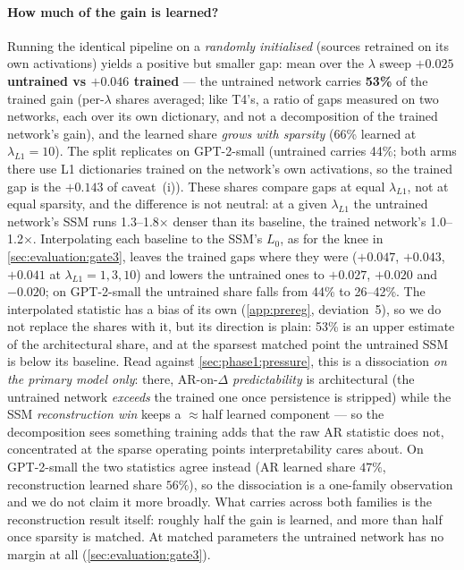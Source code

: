 \paragraph{How much of the gain is learned?}
Running the identical pipeline on a \emph{randomly initialised} \pythia{}
(sources retrained on its own activations) yields a positive but smaller gap:
mean over the $\lambda$ sweep \textbf{$+0.025$ untrained vs $+0.046$ trained}
--- the untrained network carries \textbf{53\%} of the trained gain
(per-$\lambda$ shares averaged; like T4's, a ratio of gaps measured on two
networks, each over its own dictionary, and not a decomposition of the
trained network's gain), and the
learned share \emph{grows with sparsity} (66\% learned at
$\lambda_{L1}{=}10$). The split replicates on GPT-2-small (untrained carries
44\%; both arms there use L1 dictionaries trained on the network's own
activations, so the trained gap is the $+0.143$ of caveat~(i)). These shares
compare gaps at equal $\lambda_{L1}$, not at equal sparsity, and the
difference is not neutral: at a given $\lambda_{L1}$ the untrained network's
SSM runs 1.3--1.8$\times$ denser than its baseline, the trained network's
1.0--1.2$\times$. Interpolating each baseline to the SSM's $L_0$, as for the
knee in \cref{sec:evaluation:gate3}, leaves the trained gaps where they were
($+0.047$, $+0.043$, $+0.041$ at $\lambda_{L1} = 1, 3, 10$) and lowers the
untrained ones to $+0.027$, $+0.020$ and $-0.020$; on GPT-2-small the
untrained share falls from 44\% to 26--42\%. The interpolated statistic has
a bias of its own (\cref{app:prereg}, deviation~5), so we do not replace the
shares with it, but its direction is plain: 53\% is an upper estimate of the
architectural share, and at the sparsest matched point the untrained SSM is
below its baseline. Read against \cref{sec:phase1:pressure}, this is a dissociation
\emph{on the primary model only}: there, AR-on-$\Delta$ \emph{predictability}
is architectural (the untrained network \emph{exceeds} the trained one once
persistence is stripped) while the SSM \emph{reconstruction win} keeps a
$\approx$half learned component --- so the decomposition sees something
training adds that the raw AR statistic does not, concentrated at the sparse
operating points interpretability cares about. On GPT-2-small the two
statistics agree instead (AR learned share $47\%$, reconstruction learned
share $56\%$), so the dissociation is a one-family observation and we do not
claim it more broadly. What carries across both families is the reconstruction
result itself: roughly half the gain is learned, and more than half once
sparsity is matched. At matched parameters the untrained network has no
margin at all (\cref{sec:evaluation:gate3}).

